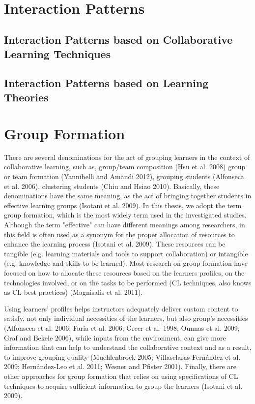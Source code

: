 \section{Interaction Patterns}

\subsection{Interaction Patterns based on Collaborative Learning Techniques}

\subsection{Interaction Patterns based on Learning Theories}

\section{Group Formation}
There are several denominations for the act of grouping learners in the context of collaborative learning, such as, group/team composition (Hsu et al. 2008) group or team formation (Yannibelli and Amandi 2012), grouping students (Alfonseca et al. 2006), clustering students (Chiu and Hsiao 2010).
Basically, these denominations have the same meaning, as the act of bringing together students in effective learning groups (Isotani et al. 2009). 
In this thesis, we adopt the term group formation, which is the most widely term used in the investigated studies.
Although the term "effective" can have different meanings among researchers, in this field is often used as a synonym for the proper allocation of resources to enhance the learning process (Isotani et al. 2009). 
These resources can be tangible (e.g. learning materials and tools to support collaboration) or intangible (e.g. knowledge and skills to be learned). 
Most research on group formation have focused on how to allocate these resources based on the learners profiles, on the technologies involved, or on the tasks to be performed (CL techniques, also knows as CL best practices) (Magnisalis et al. 2011).

Using learners' profiles helps instructors adequately deliver custom content to satisfy, not only individual necessities of the learners, but also group's necessities (Alfonseca et al. 2006; Faria et al. 2006; Greer et al. 1998; Ounnas et al. 2009; Graf and Bekele 2006), while inputs from the environment, can give more information that can help to understand the collaborative context and as a result, to improve grouping quality (Muehlenbrock 2005; Villasclaras-Fernández et al. 2009; Hernández-Leo et al. 2011; Wesner and Pfister 2001). 
Finally, there are other approaches for group formation that relies on using specifications of CL techniques to acquire sufficient information to group the learners (Isotani et al. 2009).

